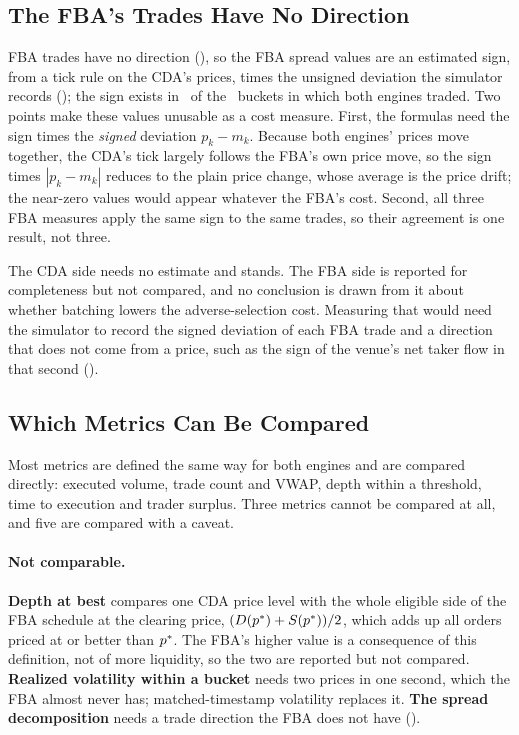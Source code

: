 \subsection{The FBA's Trades Have No Direction}
\label{sec:limitssign}

FBA trades have no direction (), so the FBA spread
values are an estimated sign, from a tick rule on the CDA's prices, times
the unsigned deviation the simulator records (); the
sign exists in \SignedFbaSpreadNSigned\ of the \SignedFbaSpreadNMatched\
buckets in which both engines traded. Two points make these values
unusable as a cost measure. First, the formulas need the sign times the
\emph{signed} deviation $p_k - m_k$. Because both engines' prices move
together, the CDA's tick largely follows the FBA's own price move, so the
sign times $|p_k - m_k|$ reduces to the plain price change, whose average is
the price drift; the near-zero values would appear whatever the FBA's cost.
Second, all three FBA measures apply the same sign to the same trades, so
their agreement is one result, not three.

The CDA side needs no estimate and stands. The FBA side is reported for
completeness but not compared, and no conclusion is drawn from it about
whether batching lowers the adverse-selection cost. Measuring that would
need the simulator to record the signed deviation of each FBA trade and a
direction that does not come from a price, such as the sign of the venue's
net taker flow in that second (\Cref{sec:formularq22}).

\subsection{Which Metrics Can Be Compared}
\label{sec:limitscomparable}

Most metrics are defined the same way for both engines and are compared
directly: executed volume, trade count and VWAP, depth within a
threshold, time to execution and trader
surplus. Three metrics cannot be compared at all, and five are compared
with a caveat.

\paragraph{Not comparable.} \textbf{Depth at best} compares one CDA price
level with the whole eligible side of the FBA schedule at the clearing
price, $(D(p^{\ast}) + S(p^{\ast}))/2$, which adds up all orders priced at or
better than $p^{\ast}$. The FBA's higher value is a consequence of this
definition, not of more liquidity, so the two are reported but not
compared. \textbf{Realized volatility within a bucket} needs two prices in
one second, which the FBA almost never has; matched-timestamp volatility
replaces it. \textbf{The spread decomposition} needs a trade direction
the FBA does not have (\Cref{sec:limitssign}).

